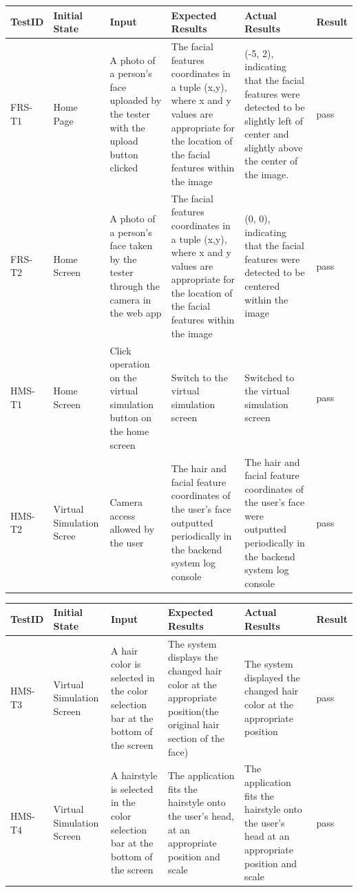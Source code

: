 \documentclass[12pt, titlepage]{article}
\begin{document}
\begin{tabular}{ |p{2cm}| p{3cm}| p{3cm}| p{3cm}|p{2cm}| p{1cm}|} 
 \hline
 TestID & Initial State & Input & Expected Results & Actual Results & Result \\ 
 \hline
 FRS-T1 & Home Page & A photo of a person's face uploaded by the tester with the upload button clicked & The facial features coordinates in a tuple (x,y), where x and y values are appropriate for the location of the facial features within the image & (-5, 2), indicating that the facial features were detected to be slightly left of center and slightly above the center of the image. & pass \\ 
 \hline
 FRS-T2 & Home Screen & A photo of a person's face taken by the tester through the camera in the web app & The facial features coordinates in a tuple (x,y), where x and y values are appropriate for the location of the facial features within the image & (0, 0), indicating that the facial features were detected to be centered within the image & pass \\
 \hline
 HMS-T1 & Home Screen & Click operation on the virtual simulation button on the home screen & Switch to the virtual simulation screen & Switched to the virtual simulation screen & pass \\
 \hline 
 HMS-T2 & Virtual Simulation Scree & Camera access allowed by the user & The hair and facial feature coordinates of the user’s face outputted periodically in the backend system log console & The hair and facial feature coordinates of the user’s face were outputted periodically in the backend system log console & pass \\
 \hline
\end{tabular}
\begin{tabular}{ |p{2cm}| p{3cm}| p{3cm}| p{3cm}|p{2cm}| p{1cm}|} 
 \hline
 TestID & Initial State & Input & Expected Results & Actual Results & Result \\ 
\hline
HMS-T3 & Virtual Simulation Screen & A hair color is selected in the color selection bar at the bottom of the screen & The system displays the changed hair color at the appropriate position(the original hair section of the face) & The system displayed the changed hair color at the appropriate position & pass\\
 \hline
 HMS-T4 & Virtual Simulation Screen & A hairstyle is selected in the color selection bar at the bottom of the screen & The application fits the hairstyle onto the user’s head, at an appropriate position and scale & The application fits the hairstyle onto the user's head at an appropriate position and scale & pass\\
 \hline
\end{tabular}
\end{document}
